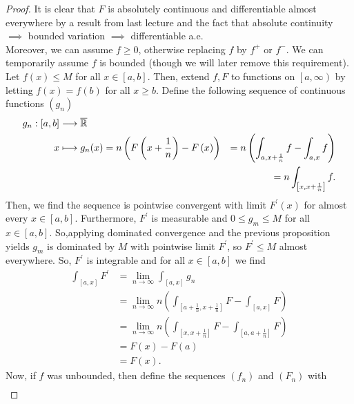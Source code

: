 \begin{proof}
	It is clear that \(F\) is absolutely continuous and differentiable almost everywhere by a result from last lecture and the fact that absolute continuity \(\implies\) bounded variation \(\implies\) differentiable a.e.\\
	Moreover, we can assume \(f \ge 0\), otherwise replacing \(f\) by \(f^{+}\) or \(f^{-}\). We can temporarily assume \(f\) is bounded (though we will later remove this requirement). Let \(f\left( x \right) \le M\) for all \(x \in \left[ a, b \right] \). Then, extend \(f, F\) to functions on \(\left[ a, \infty \right) \) by letting \(f\left( x \right) = f\left( b \right) \) for all \(x \ge b\). Define the following sequence of continuous functions \(\left( g_{n} \right) \) \begin{align*}
		g_{n}: \left[ a, b \right]  &\longrightarrow \overline{\mathbb{R}} \\
		x &\longmapsto g_{n}(x) = n\left( F\left( x + \frac{1}{n} \right) - F\left( x \right)  \right) &= n \left( \int_{a, x + \frac{1}{n}}f - \int_{a, x} f \right)\\
		  & &= n \int_{\left[ x, x + \frac{1}{n} \right] }f
	.\end{align*}
	Then, we find the sequence is pointwise convergent with limit \(F^{\prime}\left( x \right) \) for almost every \(x \in \left[ a, b \right] \). Furthermore, \(F^{\prime}\) is measurable and \(0 \le g_{m} \le M\) for all \(x \in \left[ a, b \right] \). So,applying dominated convergence and the previous proposition yields \(g_{m}\) is dominated by \(M\) with pointwise limit \(F^{\prime}\), so \(F^{\prime} \le M\) almost everywhere. So, \(F^{\prime}\) is integrable and for all \(x \in \left[ a, b \right] \) we find \begin{align*}
		\int_{\left[ a, x \right] }F^{\prime} &= \lim_{n \to \infty}\int_{\left[ a, x \right] }g_{n}\\
						      &= \lim_{n \to \infty} n( \int_{\left[ a + \frac{1}{n}, x + \frac{1}{n} \right] } F - \int_{\left[ a, x \right] } F ) \\
						      &= \lim_{n \to \infty} n \left(  \int_{\left[x, x + \frac{1}{n}\right]} F - \int_{\left[ a, a + \frac{1}{n} \right] } F \right)  \\
						      &= F\left( x \right)  - F\left( a \right)\\
						      &=  F\left( x \right)
.\end{align*}
Now, if \(f\) was unbounded, then define the sequences \(\left( f_{n} \right) \) and \(\left( F_{n} \right) \) with \begin{align*}

\end{align*}
\end{proof}
